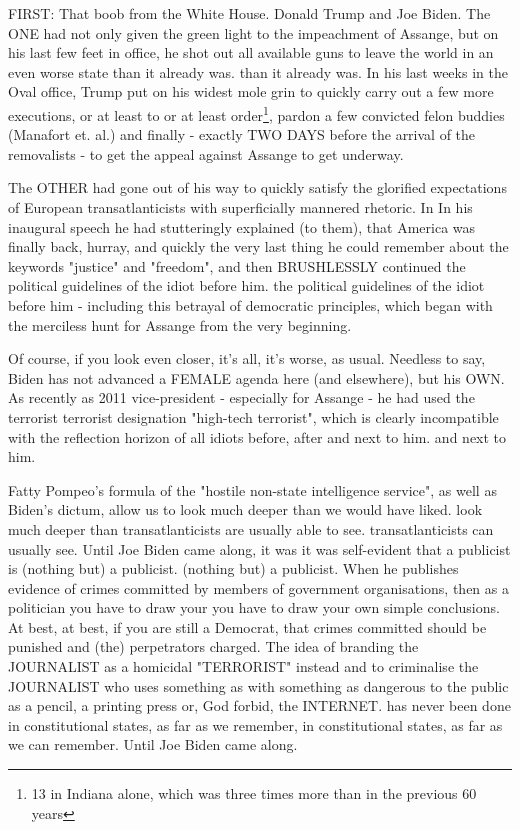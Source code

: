 \begin{multicols}{2}
FIRST: That boob from the White House. Donald
Trump and Joe Biden. The ONE had not only given the green light to the impeachment of Assange,
but on his last few feet in office, he shot out
all available guns to leave the world in an even worse state than it already was.
than it already was. In his last weeks in the Oval
office, Trump put on his widest mole grin
to quickly carry out a few more executions, or at least to
or at least 
order\footnote[22]{13 in Indiana alone, which was three times more than in the previous 60 years}, 
pardon a few convicted felon buddies (Manafort et.
al.) and finally - exactly TWO DAYS before the arrival of the
removalists - to get the appeal against Assange
to get underway.

The OTHER had gone out of his way to quickly satisfy the glorified expectations of European transatlanticists with
superficially mannered rhetoric. In
In his inaugural speech he had stutteringly explained (to them),
that America was finally back, hurray, and quickly
the very last thing he could remember about the keywords "justice" and "freedom", and then BRUSHLESSLY continued the political guidelines of the idiot before him.
the political guidelines of the idiot before him - including this betrayal of democratic principles, which began with
the merciless hunt for Assange from the very beginning.

Of course, if you look even closer, it's all,
it's worse, as usual. Needless to say, Biden
has not advanced a FEMALE agenda here (and elsewhere), but his OWN. As recently as 2011
vice-president - especially for Assange - he had used the terrorist
terrorist designation "high-tech terrorist", which is clearly incompatible with the reflection horizon of all
idiots before, after and next to him.
and next to him.

Fatty Pompeo's formula of the "hostile non-state intelligence service", as well as Biden's dictum, allow us to look much deeper than we would have liked.
look much deeper than transatlanticists are usually able to see.
transatlanticists can usually see. Until Joe Biden came along, it was
it was self-evident that a publicist is (nothing but) a publicist.
(nothing but) a publicist. When he publishes evidence of crimes
committed by members of government organisations, then as a politician you have to draw your
you have to draw your own simple conclusions. At best,
at best, if you are still a Democrat, that crimes committed should be punished and (the) perpetrators charged. The idea of branding the JOURNALIST as a homicidal "TERRORIST" instead
and to criminalise the JOURNALIST who uses something as
with something as dangerous to the public as a pencil, a printing press or, God forbid, the INTERNET.
has never been done in constitutional states, as far as we remember,
in constitutional states, as far as we can remember. Until Joe Biden came along.


\end{multicols}
